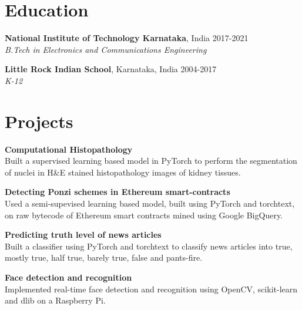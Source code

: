 \documentclass[margin]{res}
\begin{document}
  \address{National Institute of Technology\\
           Karnataka, India\\
           russel.171ec143@nitk.edu.in}
  \address{(91+) 9611212081\\
           \href{https://linkedin.com/in/rshwndsz}{linkedin.com/in/rshwndsz}\\
           \href{https://github.com/rshwndsz}{github.com/rshwndsz}}


  \begin{resume}
    \section{Education}
      \textbf{National Institute of Technology Karnataka}, India\hfill
      2017-2021 \\
      {\sl B.Tech in Electronics and Communications Engineering}\hfill

      \textbf{Little Rock Indian School}, Karnataka, India\hfill
      2004-2017 \\
      {\sl K-12}\hfill


    \section{Projects}
      \par
      \textbf{Computational Histopathology}\\
      Built a supervised learning based model in PyTorch to perform the segmentation of nuclei in H\&E stained histopathology images of kidney tissues.

      \par
      \textbf{Detecting Ponzi schemes in Ethereum smart-contracts}\\
      Used a semi-supevised learning based model, built using PyTorch and torchtext, on raw bytecode of Ethereum smart contracts mined using Google BigQuery.

      \par
      \textbf{Predicting truth level of news articles}\\
      Built a classifier using PyTorch and torchtext to classify news articles into true, mostly true, half true, barely true, false and pants-fire.

      \par
      \textbf{Face detection and recognition}\\
      Implemented real-time face detection and recognition using OpenCV, scikit-learn and dlib on a Raspberry Pi.



\end{resume}
\end{document}
